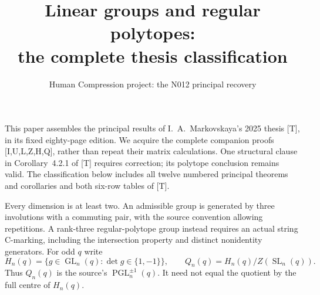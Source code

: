 \documentclass[11pt,a4paper]{article}
\title{Linear groups and regular polytopes:\\the complete thesis classification}
\author{Human Compression project: the N012 principal recovery}
\date{}
\newcommand{\GL}{\operatorname{GL}}
\newcommand{\SL}{\operatorname{SL}}
\newcommand{\PGL}{\operatorname{PGL}}
\begin{document}
\maketitle
This paper assembles the principal results of I.~A.~Markovskaya's
2025 thesis [T], in its fixed eighty-page edition. We acquire the
complete companion proofs [I,U,L,Z,H,Q], rather than repeat their
matrix calculations. One structural clause in Corollary~4.2.1 of
[T] requires correction; its polytope conclusion remains valid.
The classification below includes all twelve numbered principal
theorems and corollaries and both six-row tables of [T].

Every dimension is at least two. An admissible group is generated
by three involutions with a commuting pair, with the source convention
allowing repetitions. A rank-three regular-polytope group instead
requires an actual string C-marking, including the intersection
property and distinct nonidentity generators. For odd $q$ write
\[
 H_n(q)=\{g\in\GL_n(q):\det g\in\{1,-1\}\},\qquad
 Q_n(q)=H_n(q)/Z(\SL_n(q)).
\]
Thus $Q_n(q)$ is the source's $\PGL_n^{\pm1}(q)$.
It need not equal the quotient by the full centre of $H_n(q)$.
\end{document}
